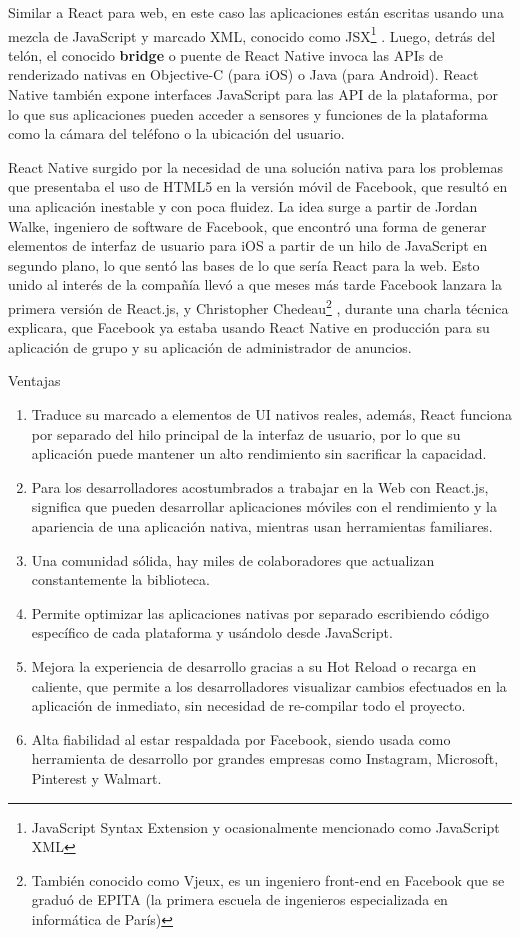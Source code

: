 Similar a React para web, en este caso las aplicaciones están escritas usando una mezcla de JavaScript y marcado XML, conocido como JSX\footnote{JavaScript Syntax Extension y ocasionalmente mencionado como JavaScript XML} . Luego, detrás del telón, el conocido \textbf{bridge} o puente de React Native invoca las APIs de renderizado nativas en Objective-C (para iOS) o Java (para Android). React Native también expone interfaces JavaScript para las API de la plataforma, por lo que sus aplicaciones pueden acceder a sensores y funciones de la plataforma como la cámara del teléfono o la ubicación del usuario.

React Native surgido por la necesidad de una solución nativa para los problemas que presentaba el uso de HTML5 en la versión móvil de Facebook, que resultó en una aplicación inestable y con poca fluidez. La idea surge a partir de Jordan Walke, ingeniero de software de Facebook, que encontró una forma de generar elementos de interfaz de usuario para iOS a partir de un hilo de JavaScript en segundo plano, lo que sentó las bases de lo que sería React para la web. Esto unido al interés de la compañía llevó a que meses más tarde Facebook lanzara la primera versión de React.js, y Christopher Chedeau\footnote{También conocido como Vjeux, es un ingeniero front-end en Facebook que se graduó de EPITA (la primera escuela de ingenieros especializada en informática de París)} , durante una charla técnica explicara, que Facebook ya estaba usando React Native en producción para su aplicación de grupo y su aplicación de administrador de anuncios.

Ventajas
\begin{enumerate}

\item	Traduce su marcado a elementos de UI nativos reales, además, React funciona por separado del hilo principal de la interfaz de usuario, por lo que su aplicación puede mantener un alto rendimiento sin sacrificar la capacidad.
\item	Para los desarrolladores acostumbrados a trabajar en la Web con React.js, significa que pueden desarrollar aplicaciones móviles con el rendimiento y la apariencia de una aplicación nativa, mientras usan herramientas familiares.
\item	Una comunidad sólida, hay miles de colaboradores que actualizan constantemente la biblioteca.
\item	Permite optimizar las aplicaciones nativas por separado escribiendo código específico de cada plataforma y usándolo desde JavaScript.
\item	Mejora la experiencia de desarrollo gracias a su Hot Reload o recarga en caliente, que permite a los desarrolladores visualizar cambios efectuados en la aplicación de inmediato, sin necesidad de re-compilar todo el proyecto.
\item	Alta fiabilidad al estar respaldada por Facebook, siendo usada como herramienta de desarrollo por grandes empresas como Instagram, Microsoft, Pinterest y Walmart.
\end{enumerate}

